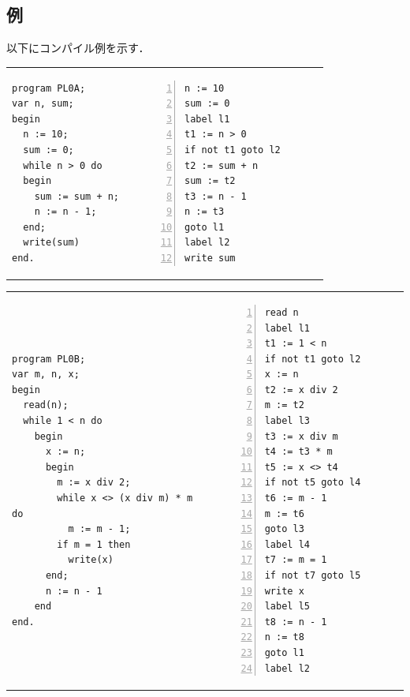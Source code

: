 \documentclass[dvipdfmx,a4j]{jbook}
\begin{document}
\subsection{例}

以下にコンパイル例を示す．

\begin{tabular}{lll}
\begin{minipage}{.3\linewidth}
\begin{Verbatim}[frame=single]
program PL0A;
var n, sum;
begin
  n := 10;
  sum := 0;
  while n > 0 do
  begin
    sum := sum + n;
    n := n - 1;
  end;
  write(sum)
end.
\end{Verbatim}
\end{minipage}
& \hspace*{2cm} & 
\begin{minipage}{.4\linewidth}
\begin{Verbatim}[numbers=left]
n := 10
sum := 0
label l1
t1 := n > 0
if not t1 goto l2
t2 := sum + n
sum := t2
t3 := n - 1
n := t3
goto l1
label l2
write sum
\end{Verbatim}
\end{minipage}
\end{tabular}

\begin{tabular}{lll}
\begin{minipage}{.5\linewidth}
\begin{Verbatim}[frame=single]
program PL0B;
var m, n, x;
begin
  read(n);
  while 1 < n do
    begin
      x := n;
      begin
        m := x div 2;
        while x <> (x div m) * m do
          m := m - 1;
        if m = 1 then
          write(x)
      end;
      n := n - 1
    end
end.
\end{Verbatim}
\end{minipage}
& \hspace*{1cm} &
\begin{minipage}{.4\linewidth}
\begin{Verbatim}[numbers=left]
read n
label l1
t1 := 1 < n
if not t1 goto l2
x := n
t2 := x div 2
m := t2
label l3
t3 := x div m
t4 := t3 * m
t5 := x <> t4
if not t5 goto l4
t6 := m - 1
m := t6
goto l3
label l4
t7 := m = 1
if not t7 goto l5
write x
label l5
t8 := n - 1
n := t8
goto l1
label l2
\end{Verbatim}
\end{minipage}
\end{tabular}
\end{document}
